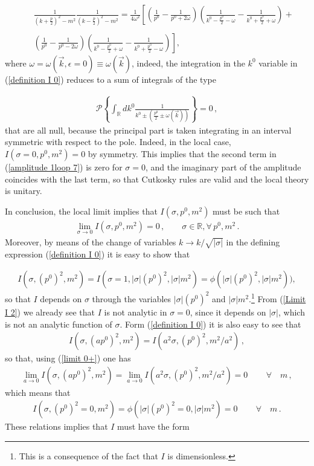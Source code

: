 \documentclass[a4paper,11pt]{article}
\newcommand{\be}{\begin{eqnarray}}
\newcommand{\ee}{\end{eqnarray}}
\begin{document}
\be\label{definition g}
&&\nonumber\frac{1}{(k+\frac{p}{2})^2 - m^2} \frac{1}{(k-\frac{p}{2})^2 - m^2} = \frac{1}{4 \omega^2} \left[\left(\frac{1}{p^0}-\frac{1}{p^0+2\omega}\right)
\left(\frac{1}{k^0-\frac{p^0}{2}-\omega}-\frac{1}{k^0+\frac{p^0}{2}+\omega}\right) +\right.\\
&&\nonumber\\
&&  \left. \left(\frac{1}{p^0}-\frac{1}{p^0-2\omega}\right)
\left(\frac{1}{k^0-\frac{p^0}{2}+\omega}-\frac{1}{k^0+\frac{p^0}{2}-\omega}\right)
\right] ,
\ee
where $\omega=\omega(\vec{k},\epsilon=0)\equiv\omega(\vec{k})$, indeed, the integration in the $k^0$ variable in (\ref{definition I 0}) reduces to a sum of integrals of the type


\be\label{integral local case 1}
\mathcal{P}\left\{\int_{ \mathbb{R}}  d k^0
 \frac{1}{k^0 \pm \left(\frac{p^0}{2} \pm \omega(\vec{k})\right)} \right\} = 0 \, ,
\ee
that are all null, because the principal part is taken integrating in an interval symmetric with respect to the pole. Indeed, in the local case, $I(\sigma=0,p^0,m^2)=0$ by symmetry. This implies that the second term in (\ref{amplitude 1loop 7}) is zero for $\sigma=0$, and the imaginary part of the amplitude coincides with the last term, so that Cutkosky rules are valid and the local theory is unitary. 

In conclusion, the local limit implies that   $I(\sigma, p^0,m^2)$ must be such that
\be\label{limit 0+}
\lim\limits_{\sigma \rightarrow 0} I(\sigma, p^0,m^2) = 0 \,,  \qquad \sigma \in \mathbb{R} , \forall \, p^0, m^2 \, .
\ee
Moreover, by means of the change of variables $k\rightarrow k/\sqrt{|\sigma|}$ in the defining expression (\ref{definition I 0}) it is easy to show that 

\be\label{Limit I 2}
I(\sigma, (p^0)^2,m^2)= I(\sigma = 1,|\sigma|(p^0)^2,|\sigma| m^2) = \phi(|\sigma| \left(p^0\right)^2,|\sigma| m^2)), 
\ee
so that $I$ depends on $\sigma$  through the variables $|\sigma| \left(p^0\right)^2$ and $|\sigma| m^2$.\footnote{This is a consequence of the fact that $I$ is dimensionless.} From (\ref{Limit I 2}) we already see that $I$ is not analytic in $\sigma =0$, since it depends on $|\sigma|$, which is not an analytic function of $\sigma$. 
Form (\ref{definition I 0}) it is also easy to see that 
\be\label{Limit I 1}
I(\sigma, (a p^0)^2,m^2)= I(a^2 \sigma,(p^0)^2,m^2/a^2)\, , 
\ee
so that, using (\ref{limit 0+}) one has
\be
\lim\limits_{a \rightarrow 0} I(\sigma, (a p^0)^2,m^2) = \lim\limits_{a \rightarrow 0} I(a^2\sigma, (p^0)^2,m^2/a^2)= 0 \, \qquad \forall \quad  m \, ,
\ee
which means that
\be
I(\sigma, (p^0)^2=0,m^2) = \phi(|\sigma| (p^0)^2= 0, |\sigma| m^2) = 0 \, \qquad \forall \quad  m \, .
\ee
These relations implies that $I$ must have the form
\end{document}
